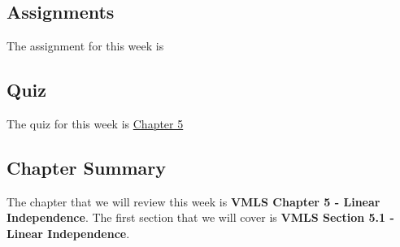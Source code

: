 \subsection{Assignments}

The assignment for this week is   

\subsection{Quiz}

The quiz for this week is \href{https://applied.cs.colorado.edu/mod/quiz/view.php?id=50725}{Chapter 5} \textbullet {}  

\subsection{Chapter Summary}

The chapter that we will review this week is \textbf{VMLS Chapter 5 - Linear Independence}. The first section that we will cover is \textbf{VMLS Section 5.1 - Linear Independence}.

